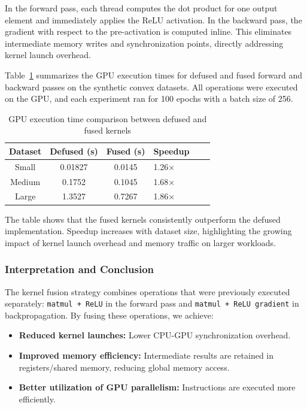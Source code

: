 \documentclass[conference, 12pt]{IEEEtran}
\begin{document}
In the forward pass, each thread computes the dot product for one output element and immediately applies the ReLU activation. In the backward pass, the gradient with respect to the pre-activation is computed inline. This eliminates intermediate memory writes and synchronization points, directly addressing kernel launch overhead.

Table~\ref{tab:fusion_perf} summarizes the GPU execution times for defused and fused forward and backward passes on the synthetic convex datasets. All operations were executed on the GPU, and each experiment ran for 100 epochs with a batch size of 256.

\begin{table}[h!]
\centering
\caption{GPU execution time comparison between defused and fused kernels}
\label{tab:fusion_perf}
\begin{tabular}{|c|c|c|p{2cm}|p{2cm}|c|}
\hline
\textbf{Dataset} & \textbf{Defused (s)} & \textbf{Fused (s)} & \textbf{Speedup} \\
\hline
Small    & 0.01827         & 0.0145        & 1.26× \\
Medium   & 0.1752         & 0.1045        & 1.68× \\
Large   & 1.3527          & 0.7267        & 1.86× \\
\hline
\end{tabular}
\end{table}

The table shows that the fused kernels consistently outperform the defused implementation. Speedup increases with dataset size, highlighting the growing impact of kernel launch overhead and memory traffic on larger workloads.

\subsubsection{Interpretation and Conclusion}
The kernel fusion strategy combines operations that were previously executed separately: \texttt{matmul + ReLU} in the forward pass and \texttt{matmul + ReLU gradient} in backpropagation. By fusing these operations, we achieve:

\begin{itemize}
    \item \textbf{Reduced kernel launches:} Lower CPU-GPU synchronization overhead.
    \item \textbf{Improved memory efficiency:} Intermediate results are retained in registers/shared memory, reducing global memory access.
    \item \textbf{Better utilization of GPU parallelism:} Instructions are executed more efficiently.
\end{itemize}
\end{document}
